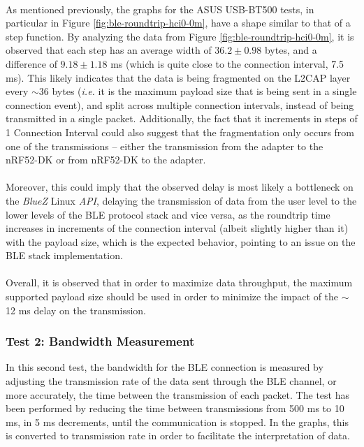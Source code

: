 \paragraph{} As mentioned previously, the graphs for the ASUS USB-BT500 tests, in particular in Figure \ref{fig:ble-roundtrip-hci0-0m}, have a shape similar to that of a step function. By analyzing the data from Figure \ref{fig:ble-roundtrip-hci0-0m}, it is observed that each step has an average width of $36.2 \pm 0.98$ bytes, and a difference of $9.18 \pm 1.18$ ms (which is quite close to the connection interval, 7.5 ms). This likely indicates that the data is being fragmented on the \acs{L2CAP} layer every ${\sim} $36 bytes (\textit{i.e.} it is the maximum payload size that is being sent in a single connection event), and split across multiple connection intervals, instead of being transmitted in a single packet. Additionally, the fact that it increments in steps of 1 Connection Interval could also suggest that the fragmentation only occurs from one of the transmissions -- either the transmission from the adapter to the nRF52-DK or from nRF52-DK to the adapter. 

\paragraph{} Moreover, this could imply that the observed delay is most likely a bottleneck on the \textit{BlueZ} Linux \textit{API}, delaying the transmission of data from the user level to the lower levels of the \acs{BLE} protocol stack and vice versa, as the roundtrip time increases in increments of the connection interval (albeit slightly higher than it) with the payload size, which is the expected behavior, pointing to an issue on the \acs{BLE} stack implementation.

\paragraph{} Overall, it is observed that in order to maximize data throughput, the maximum supported payload size should be used in order to minimize the impact of the ${\sim} $12 ms delay on the transmission.

\subsubsection{Test 2: Bandwidth Measurement}

In this second test, the bandwidth for the \acs{BLE} connection is measured by adjusting the transmission rate of the data sent through the BLE channel, or more accurately, the time between the transmission of each packet. The test has been performed by reducing the time between transmissions from 500 ms to 10 ms, in 5 ms decrements, until the communication is stopped. In the graphs, this is converted to transmission rate in order to facilitate the interpretation of data.

